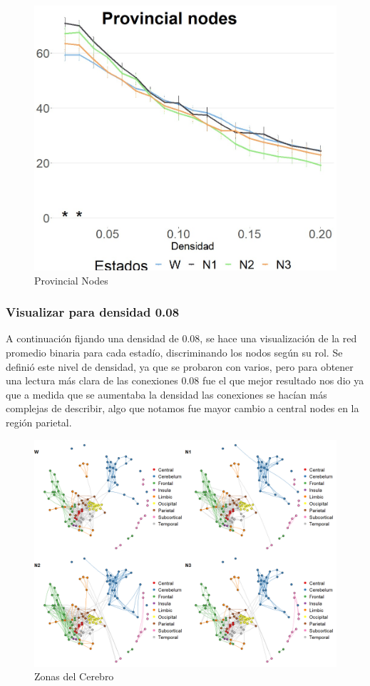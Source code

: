 \begin{figure}[H]
    \centering
    \includegraphics[width = 5in]{img/5_provincialnodes.jpg}
    \caption{Provincial Nodes}
    \label{fig:5_provincialnodes}
\end{figure}


\subsubsection{Visualizar para densidad 0.08}
A continuación fijando una densidad de 0.08, se hace una visualización de la red promedio binaria para cada estadío, discriminando los nodos según su rol. Se definió este nivel de densidad, ya que se probaron con varios, pero  para obtener una lectura más clara de las conexiones $0.08$ fue el que mejor resultado nos dio ya que a medida que se aumentaba la densidad las conexiones se hacían más complejas de describir, algo que notamos fue mayor cambio a central nodes en la región parietal.

\begin{figure}[H]
    \centering
    \includegraphics[width=\textwidth]{img/5_redescerebro_008.png}
    \caption{Zonas del Cerebro}
    \label{fig:Ejer5_redescerebro_008}
\end{figure}

